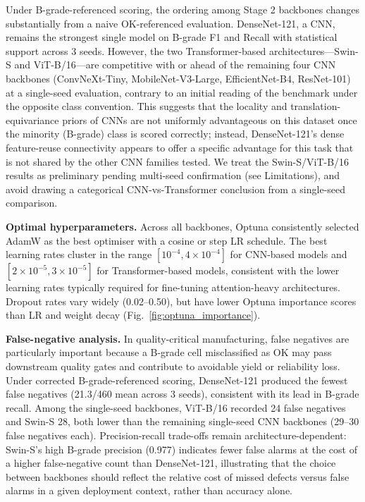 \documentclass[conference]{IEEEtran}
\begin{document}
Under B-grade-referenced scoring, the ordering among Stage 2 backbones changes substantially from a naive OK-referenced evaluation. DenseNet-121, a CNN, remains the strongest single model on B-grade F1 and Recall with statistical support across 3 seeds. However, the two Transformer-based architectures---Swin-S and ViT-B/16---are competitive with or ahead of the remaining four CNN backbones (ConvNeXt-Tiny, MobileNet-V3-Large, EfficientNet-B4, ResNet-101) at a single-seed evaluation, contrary to an initial reading of the benchmark under the opposite class convention. This suggests that the locality and translation-equivariance priors of CNNs are not uniformly advantageous on this dataset once the minority (B-grade) class is scored correctly; instead, DenseNet-121's dense feature-reuse connectivity appears to offer a specific advantage for this task that is not shared by the other CNN families tested. We treat the Swin-S/ViT-B/16 results as preliminary pending multi-seed confirmation (see Limitations), and avoid drawing a categorical CNN-vs-Transformer conclusion from a single-seed comparison.

\textbf{Optimal hyperparameters.} Across all backbones, Optuna consistently selected AdamW as the best optimiser with a cosine or step LR schedule. The best learning rates cluster in the range $[10^{-4}, 4\times10^{-4}]$ for CNN-based models and $[2\times10^{-5}, 3\times10^{-5}]$ for Transformer-based models, consistent with the lower learning rates typically required for fine-tuning attention-heavy architectures. Dropout rates vary widely (0.02--0.50), but have lower Optuna importance scores than LR and weight decay (Fig.~\ref{fig:optuna_importance}).

\textbf{False-negative analysis.} In quality-critical manufacturing, false negatives are particularly important because a B-grade cell misclassified as OK may pass downstream quality gates and contribute to avoidable yield or reliability loss. Under corrected B-grade-referenced scoring, DenseNet-121 produced the fewest false negatives (21.3/460 mean across 3 seeds), consistent with its lead in B-grade recall. Among the single-seed backbones, ViT-B/16 recorded 24 false negatives and Swin-S 28, both lower than the remaining single-seed CNN backbones (29--30 false negatives each). Precision-recall trade-offs remain architecture-dependent: Swin-S's high B-grade precision (0.977) indicates fewer false alarms at the cost of a higher false-negative count than DenseNet-121, illustrating that the choice between backbones should reflect the relative cost of missed defects versus false alarms in a given deployment context, rather than accuracy alone.
\end{document}
